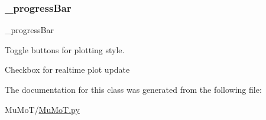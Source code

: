 \subsubsection{\texorpdfstring{\+\_\+progress\+Bar}{\_progressBar}}
{\footnotesize\ttfamily \+\_\+progress\+Bar\hspace{0.3cm}{\ttfamily [private]}}



Toggle buttons for plotting style. 

Checkbox for realtime plot update 

The documentation for this class was generated from the following file\+:\begin{DoxyCompactItemize}
\item 
Mu\+Mo\+T/\hyperlink{_mu_mo_t_8py}{Mu\+Mo\+T.\+py}\end{DoxyCompactItemize}
